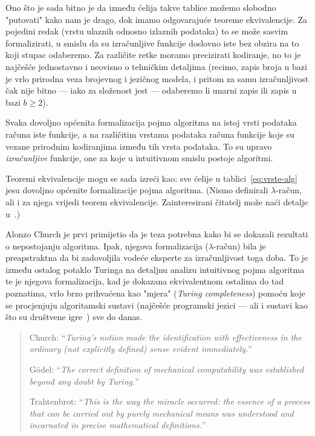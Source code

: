 Ono što je sada bitno je da između ćelija takve tablice možemo slobodno "putovati" kako nam je drago, dok imamo odgovarajuće teoreme ekvivalencije. Za pojedini redak (vrstu ulaznih odnosno izlaznih podataka) to se može sasvim formalizirati, u smislu da su izračunljive funkcije doslovno iste bez obzira na to koji stupac odaberemo. Za različite retke moramo precizirati kodiranje, no to je najčešće jednostavno i neovisno o tehničkim detaljima (recimo, zapis broja u bazi je vrlo prirodna veza brojevnog i jezičnog modela, i pritom za samu izračunljivost čak nije bitno --- iako za složenost jest --- odaberemo li unarni zapis ili zapis u bazi $b\ge2$).

\begin{ctteza}
Svaka dovoljno općenita formalizacija pojma algoritma na istoj vrsti podataka ra\-ču\-na iste funkcije, a na različitim vrstama podataka računa funkcije koje su vezane prirodnim kodiranjima između tih vrsta podataka. To su upravo \emph{izračunljive} funkcije, one za koje u intuitivnom smislu postoje algoritmi.
\end{ctteza}

Teoremi ekvivalencije mogu se sada izreći kao: sve ćelije u tablici~\eqref{eq:vrste-alg} jesu dovoljno općenite formalizacije pojma algoritma. (Nismo definirali $\lambda$-račun, ali i za njega vrijedi teorem ekvivalencije. Zainteresirani čitatelj može naći detalje u~\cite{lovnicki}.)

Alonzo Church je prvi primijetio da je teza potrebna kako bi se dokazali rezultati o nepostojanju algoritma. Ipak, njegova formalizacija ($\lambda$-račun) bila je preapstraktna da bi zadovoljila vodeće eksperte za izračunljivost toga doba. To je između ostalog potaklo Turinga na detaljnu analizu intuitivnog pojma algoritma te je njegova formalizacija, kad je dokazana ekvivalentnom ostalima do tad poznatima, vrlo brzo prihvaćena kao "mjera" (\!\emph{Turing completeness}) pomoću koje se procjenjuju algoritamski sustavi (najčešće programski jezici --- ali i sustavi kao što su društvene igre~\cite{magicTuring}) sve do danas.

\begin{quote}
    Church: ``\!\emph{Turing's notion made the identification with effectiveness in the ordinary (not explicitly defined) sense evident immediately.}''
    
    G\"odel: ``\!\emph{The correct definition of mechanical computability was established beyond any doubt by Turing.}''

    Trahtenbrot: ``\!\emph{This is the way the miracle occurred: the essence of a process that can be carried out by purely mechanical means was understood and incarnated in precise mathematical definitions.}''
\end{quote}

